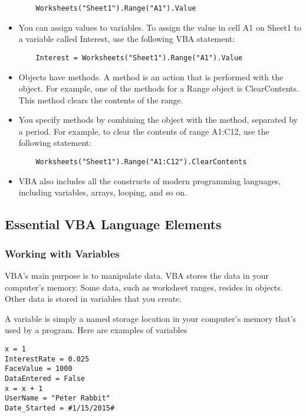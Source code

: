 \documentclass[
]{article}
\theoremstyle{definition}
\theoremstyle{definition}
\theoremstyle{definition}
\theoremstyle{definition}
\theoremstyle{remark}
\begin{document}
\begin{itemize}
\begin{verbatim}
    Worksheets("Sheet1").Range("A1").Value
\end{verbatim}
\item
  You can assign values to variables. To assign the value in cell A1
  on Sheet1 to a variable called Interest, use the following VBA
  statement:

\begin{verbatim}
    Interest = Worksheets("Sheet1").Range("A1").Value
\end{verbatim}
\item
  Objects have methods. A method is an action that is performed with
  the object. For example, one of the methods for a Range object is
  ClearContents. This method clears the contents of the range.
\item
  You specify methods by combining the object with the method,
  separated by a period. For example, to clear the contents of range
  A1:C12, use the following statement:

\begin{verbatim}
    Worksheets("Sheet1").Range("A1:C12").ClearContents
\end{verbatim}
\item
  VBA also includes all the constructs of modern programming
  languages, including variables, arrays, looping, and so on.
\end{itemize}

\hypertarget{essential-vba-language-elements}{%
\subsection{Essential VBA Language Elements}\label{essential-vba-language-elements}}

\hypertarget{working-with-variables}{%
\subsubsection{Working with Variables}\label{working-with-variables}}

VBA's main purpose is to manipulate data. VBA stores the data in your
computer's memory. Some data, such as worksheet ranges, resides in
objects. Other data is stored in variables that you create.

A variable is simply a named storage location in your computer's
memory that's used by a program. Here are examples of variables

\begin{verbatim}
x = 1
InterestRate = 0.025
FaceValue = 1000
DataEntered = False
x = x + 1
UserName = "Peter Rabbit"
Date_Started = #1/15/2015#
\end{verbatim}
\end{document}
